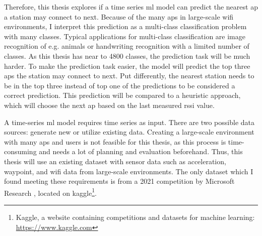 Therefore, this thesis explores if a time series \ac{ml} model can predict the nearest \ac{ap} a station may connect to next.
Because of the many \acp{ap} in large-scale \ac{wifi} environments, I interpret this prediction as a multi-class classification problem with many classes.
Typical applications for multi-class classification are image recognition of e.g. animals or handwriting recognition with a limited number of classes.
As this thesis has near to 4800 classes, the prediction task will be much harder.
To make the prediction task easier, the model will predict the top three \acp{ap} the station may connect to next.
Put differently, the nearest station needs to be in the top three instead of top one of the predictions to be considered a correct prediction.
This prediction will be compared to a heuristic approach, which will choose the next \ac{ap} based on the last measured \ac{rssi} value.

A time-series \ac{ml} model requires time series  as input.
There are two possible data sources: generate new or utilize existing data. 
Creating a large-scale environment with many \acp{ap} and users is not feasible for this thesis, as this process is time-consuming and needs a lot of planning and evaluation beforehand.
Thus, this thesis will use an existing dataset with sensor data such as acceleration, waypoint, and \ac{wifi} data from large-scale environments.
The only dataset which I found meeting these requirements is from a 2021 competition by Microsoft Research \cite{IndoorLocationNavigation}, located on kaggle\footnote{Kaggle, a website containing competitions and datasets for machine learning: \url{https://www.kaggle.com}}.

